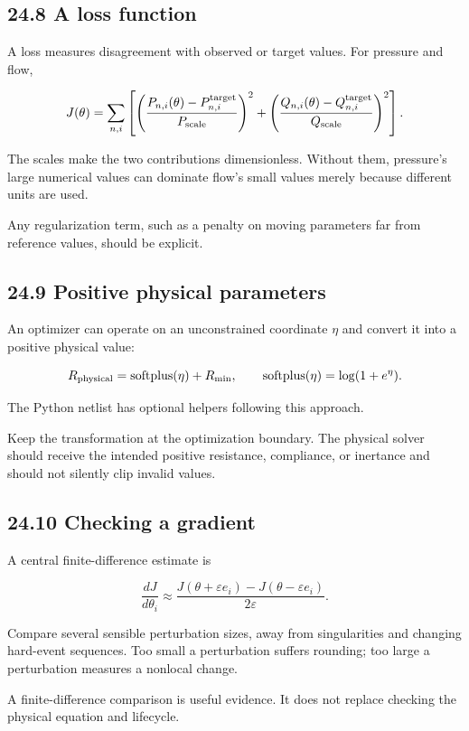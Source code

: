 \documentclass[11pt,a4paper]{article}
\begin{document}
\subsection{24.8 A loss function}
A loss measures disagreement with observed or target values. For pressure and flow,


\begingroup\small
\[
J(\theta)=
\sum_{n,i}\left[
\left(\frac{P_{n,i}(\theta)-P_{n,i}^{\rm target}}{P_{\rm scale}}\right)^2
+
\left(\frac{Q_{n,i}(\theta)-Q_{n,i}^{\rm target}}{Q_{\rm scale}}\right)^2
\right].
\]
\endgroup


The scales make the two contributions dimensionless. Without them, pressure's large numerical values can dominate flow's small values merely because different units are used.

Any regularization term, such as a penalty on moving parameters far from reference values, should be explicit.

\subsection{24.9 Positive physical parameters}
An optimizer can operate on an unconstrained coordinate \(\eta\) and convert it into a positive physical value:


\begingroup\small
\[
R_{\rm physical}=\operatorname{softplus}(\eta)+R_{\min},
\qquad
\operatorname{softplus}(\eta)=\log(1+e^\eta).
\]
\endgroup


The Python netlist has optional helpers following this approach.

Keep the transformation at the optimization boundary. The physical solver should receive the intended positive resistance, compliance, or inertance and should not silently clip invalid values.

\subsection{24.10 Checking a gradient}
A central finite-difference estimate is


\begingroup\small
\[
\frac{dJ}{d\theta_i}
\approx
\frac{
J(\theta+\varepsilon e_i)-J(\theta-\varepsilon e_i)
}{2\varepsilon}.
\]
\endgroup


Compare several sensible perturbation sizes, away from singularities and changing hard-event sequences. Too small a perturbation suffers rounding; too large a perturbation measures a nonlocal change.

A finite-difference comparison is useful evidence. It does not replace checking the physical equation and lifecycle.
\end{document}
